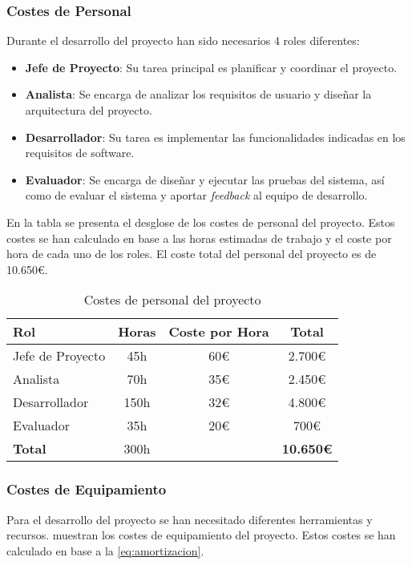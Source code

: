 \subsubsection{Costes de Personal}
Durante el desarrollo del proyecto han sido necesarios 4 roles diferentes:
\begin{itemize}
    \item \textbf{Jefe de Proyecto}: Su tarea principal es planificar y coordinar el proyecto.
    \item \textbf{Analista}: Se encarga de analizar los requisitos de usuario y diseñar la arquitectura del proyecto.
    \item \textbf{Desarrollador}: Su tarea es implementar las funcionalidades indicadas en los requisitos de software.
    \item \textbf{Evaluador}: Se encarga de diseñar y ejecutar las pruebas del sistema, así como de evaluar el sistema y aportar \textit{feedback} al equipo de desarrollo.
\end{itemize}

En la tabla  se presenta el desglose de los costes de personal del proyecto. Estos costes se han calculado en base a las horas estimadas de trabajo y el coste por hora de cada uno de los roles. El coste total del personal del proyecto es de 10.650€.

\begin{table}[htbp]
    \centering
    \caption{Costes de personal del proyecto}
    \label{tab:costes_personal}
    \begin{tabular}{@{}lccc@{}}
    \toprule
    \textbf{Rol}     & \textbf{Horas} & \textbf{Coste por Hora} & \textbf{Total}   \\ \midrule
    Jefe de Proyecto & 45h            & 60\euro                 & 2.700\euro       \\
    Analista         & 70h            & 35\euro                 & 2.450\euro       \\
    Desarrollador    & 150h           & 32\euro                 & 4.800\euro       \\
    Evaluador        & 35h            & 20\euro                 & 700\euro         \\ \midrule
    \textbf{Total}   & 300h           &                         & \textbf{10.650\euro} \\ \bottomrule
    \end{tabular}
\end{table}

\subsubsection{Costes de Equipamiento}
Para el desarrollo del proyecto se han necesitado diferentes herramientas y recursos.  muestran los costes de equipamiento del proyecto. Estos costes se han calculado en base a la \eqref{eq:amortizacion}. 


